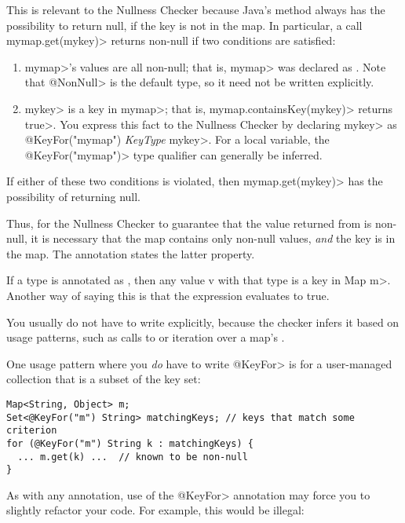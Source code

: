 This is relevant to the Nullness Checker because
Java's
method always has the possibility to return null, if the key is not in the
map.
In particular,
a call \<mymap.get(mykey)> returns non-null if two conditions are satisfied:
\begin{enumerate}
\item \<mymap>'s values are all non-null; that is, \<mymap> was
  declared as .  Note
  that \<@NonNull> is the default type, so it need not be written explicitly.
\item \<mykey> is a key in \<mymap>; that is, \<mymap.containsKey(mykey)>
  returns \<true>.  You express this fact to the Nullness Checker by
  declaring \<mykey> as \<@KeyFor("mymap") \emph{KeyType} mykey>.  For a
  local variable, the \<@KeyFor("mymap")> type qualifier can generally be
  inferred.
\end{enumerate}
\noindent
If either of these two conditions is violated, then \<mymap.get(mykey)> has
the possibility of returning null.


Thus, for the Nullness Checker to guarantee that the value returned from  is
non-null, it is necessary that the map contains only non-null values,
\emph{and} the key is in the map.
The  annotation states the latter
property.

If a type is annotated as , then any value v with that type
is a key in Map \<m>.  Another way of saying this is that the expression
 evaluates to true.

You usually do not have to write  explicitly, because the
checker infers it based on usage patterns, such as calls to
 or iteration over a map's
.

One usage pattern where you \emph{do} have to write \<@KeyFor> is for a
user-managed collection that is a subset of the key set:

\begin{Verbatim}
Map<String, Object> m;
Set<@KeyFor("m") String> matchingKeys; // keys that match some criterion
for (@KeyFor("m") String k : matchingKeys) {
  ... m.get(k) ...  // known to be non-null
}
\end{Verbatim}

As with any annotation, use of the \<@KeyFor> annotation may force you to
slightly refactor your code.  For example, this would be illegal:

